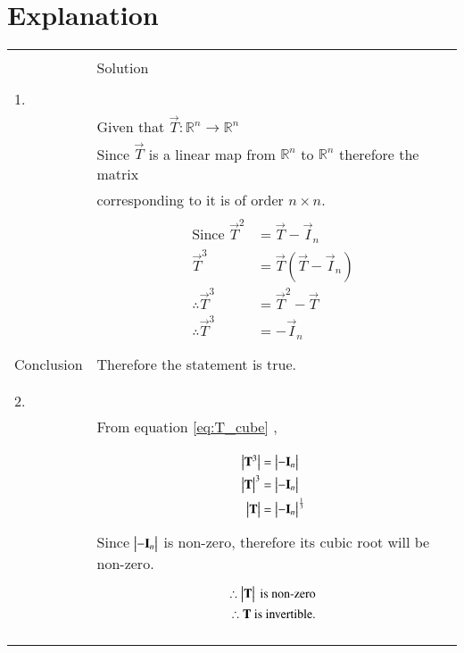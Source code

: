 \documentclass[journal,12pt]{IEEEtran}
\begin{document}
\section{\textbf{Explanation}}
\renewcommand{\thetable}{2}
\begin{longtable}{|l|l|}
\hline
\multirow{3}{*}{} & \\
Statement&Solution\\
\hline
&\\
1.&\\
&Given that $\vec{T}:\mathbb{R}^n \rightarrow \mathbb{R}^n$\\
&Since $\vec{T}$ is a linear map from $\mathbb{R}^n$ to $\mathbb{R}^n$ therefore the matrix\\
&corresponding to it is of order $n \times n$.\\
&\parbox{6cm}{\begin{align}
    \mbox{Since }\vec{T}^2&=\vec{T}-\vec{I}_{n}\\
    \vec{T}^3&=\vec{T}(\vec{T}-\vec{I}_{n})\\
    \therefore\vec{T}^3&=\vec{T}^2-\vec{T}\\
    \therefore \vec{T}^3&=-\vec{I}_{n}\label{eq:T_cube}
\end{align}}\\
\hline
&\\
Conclusion&Therefore the statement is true.\\
&\\
\hline
&\\
2.&\\
& From equation \eqref{eq:T_cube} ,\\
&\\
&\parbox{6cm}{\begin{align}
\begin{vmatrix}\mathbf{T}^3\end{vmatrix}&=\begin{vmatrix}-\mathbf{I}_{n}\end{vmatrix}\\
\begin{vmatrix}\mathbf{T}\end{vmatrix}^3&=\begin{vmatrix}-\mathbf{I}_{n}\end{vmatrix}\\
\begin{vmatrix}\mathbf{T}\end{vmatrix}&=\begin{vmatrix}-\mathbf{I}_{n}\end{vmatrix}^{\frac{1}{3}}
\end{align}}\\
&Since $\begin{vmatrix}-\mathbf{I}_{n}\end{vmatrix}$ is non-zero, therefore its cubic root will be non-zero.\\
&\parbox{6cm}{\begin{align}
    \therefore\begin{vmatrix}\mathbf{T}\end{vmatrix}\mbox{ is non-zero}\label{eq:det_T}\\
    \therefore\mathbf{T}\mbox{ is invertible.}
\end{align}}\\
&\\
\hline
&\\

\end{longtable}
\end{document}

